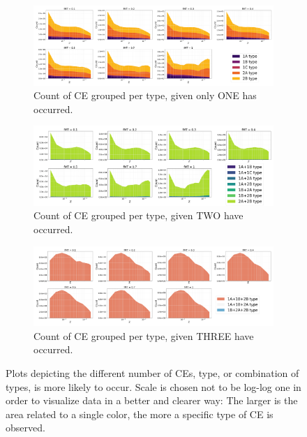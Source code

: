 \documentclass[preprint,12pt]{elsarticle}
\begin{document}
\begin{figure}[htp]
    \begin{subfigure}[t]{1\textwidth}
    \centering
        \includegraphics[width=1\textwidth]{Images/ONE_CE_which.png}
        \caption{Count of CE grouped per type, given only ONE has occurred.}
        \label{img:ONE_CE_which}
    \end{subfigure}
    \hfill
    \begin{subfigure}[t]{1\textwidth}
        \centering
        \includegraphics[width=1\textwidth]{Images/TWO_CE_which.png}
        \caption{Count of CE grouped per type, given TWO have occurred.}
        \label{img:TWO_CE_which}
    \end{subfigure} 
    \hfill
    \begin{subfigure}[t]{1\textwidth}
      \centering
      \includegraphics[width=1\textwidth]{Images/THREE_CE_which.png}
      \caption{Count of CE grouped per type, given THREE have occurred.}
      \label{img:THREE_CE_which}
    \end{subfigure} 
    \caption{Plots depicting the different number of CEs, type, or combination of types, is more likely to occur. Scale is chosen not to be log-log one in order to visualize data in a better and clearer way: The larger is the area related to a single color, the more a specific type of CE is observed.}
    \label{img:number_CE_which}
\end{figure}
\end{document}
